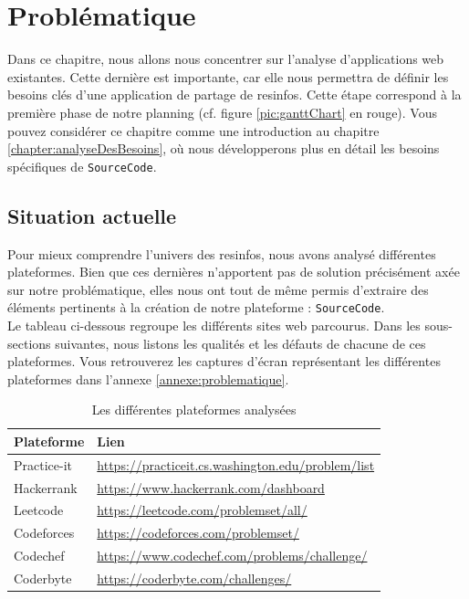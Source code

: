 \chapter{Problématique}
\label{chapter:problematique}

Dans ce chapitre, nous allons nous concentrer sur l'analyse d'applications web existantes. Cette dernière est importante, car elle nous permettra de définir les besoins clés d'une application de partage de \glspl{resinfo}. Cette étape correspond à la première phase de notre planning (cf. figure \ref{pic:ganttChart} en rouge). Vous pouvez considérer ce chapitre comme une introduction au chapitre \ref{chapter:analyseDesBesoins}, où nous développerons plus en détail les besoins spécifiques de \texttt{SourceCode}.

\section{Situation actuelle}
\label{section:situation}

Pour mieux comprendre l'univers des \glspl{resinfo}, nous avons analysé différentes plateformes. Bien que ces dernières n'apportent pas de solution précisément axée sur notre problématique, elles nous ont tout de même permis d'extraire des éléments pertinents à la création de notre plateforme : \texttt{SourceCode}.\\

Le tableau ci-dessous regroupe les différents sites web parcourus. Dans les sous-sections suivantes, nous listons les qualités et les défauts de chacune de ces plateformes. Vous retrouverez les captures d'écran représentant les différentes plateformes dans l'annexe \ref{annexe:problematique}.\\

\begin{table}[H]
    \centering
    \begin{tabular}{| l | l |}
    \hline
        Plateforme & Lien \\
    \hline
        Practice-it &
        \href{https://practiceit.cs.washington.edu/problem/list}{https://practiceit.cs.washington.edu/problem/list} \\ 
    \hline
        Hackerrank &
        \href{https://www.hackerrank.com/dashboard}{https://www.hackerrank.com/dashboard} \\ 
    \hline
        Leetcode &
        \href{https://leetcode.com/problemset/all/}{https://leetcode.com/problemset/all/} \\ 
    \hline
        Codeforces &
        \href{https://codeforces.com/problemset/}{https://codeforces.com/problemset/} \\ 
    \hline
        Codechef &
        \href{https://www.codechef.com/problems/challenge/}{https://www.codechef.com/problems/challenge/} \\ 
    \hline
        Coderbyte &
        \href{https://coderbyte.com/challenges/}{https://coderbyte.com/challenges/} \\ 
    \hline
    \end{tabular}
    \caption{Les différentes plateformes analysées}
    \label{table:compPlateforme}
\end{table}

